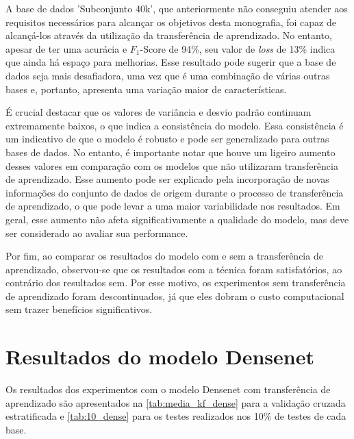 A base de dados 'Subconjunto 40k', que anteriormente não conseguiu atender aos requisitos necessários para alcançar os objetivos desta monografia, foi capaz de alcançá-los através da utilização da transferência de aprendizado. 
No entanto, apesar de ter uma acurácia e $F_{1}$-Score de 94\%, seu valor de \textit{loss} de 13\% indica que ainda há espaço para melhorias. 
Esse resultado pode sugerir que a base de dados seja mais desafiadora, uma vez que é uma combinação de várias outras bases e, portanto, apresenta uma variação maior de características.

É crucial destacar que os valores de variância e desvio padrão continuam extremamente baixos, o que indica a consistência do modelo.
Essa consistência é um indicativo de que o modelo é robusto e pode ser generalizado para outras bases de dados.
No entanto, é importante notar que houve um ligeiro aumento desses valores em comparação com os modelos que não utilizaram transferência de aprendizado. 
Esse aumento pode ser explicado pela incorporação de novas informações do conjunto de dados de origem durante o processo de transferência de aprendizado, o que pode levar a uma maior variabilidade nos resultados. 
Em geral, esse aumento não afeta significativamente a qualidade do modelo, mas deve ser considerado ao avaliar sua performance.

Por fim, ao comparar os resultados do modelo com e sem a transferência de aprendizado, observou-se que os resultados com a técnica foram satisfatórios, ao contrário dos resultados sem. 
Por esse motivo, os experimentos sem transferência de aprendizado foram descontinuados, já que eles dobram o custo computacional sem trazer benefícios significativos.


\section{Resultados do modelo Densenet}

Os resultados dos experimentos com o modelo Densenet com transferência de aprendizado são apresentados na \autoref{tab:media_kf_dense} para a validação cruzada estratificada e \autoref{tab:10_dense} para os testes realizados nos 10\% de testes de cada base.

